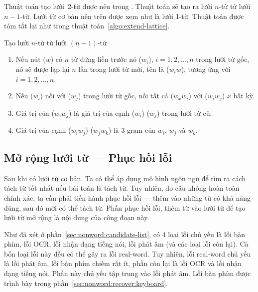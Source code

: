 \documentclass[a4paper,oneside,14pt]{extbook} %
\begin{document}
Thuật toán tạo lưới~2-từ được nêu trong \cite{Ravishankar}. Thuật toán
sẽ tạo ra lưới $n$-từ từ lưới $n-1$-từ. Lưới từ cơ bản nên trên được
xem như là lưới 1-từ. Thuật toán được tóm tắt lại như trong thuật
toán~\ref{algo:extend-lattice}.

\begin{algo}
\caption{Tạo lưới $n$-từ từ lưới $(n-1)$-từ}
\label{algo:extend-lattice}
\begin{enumerate}
\item Nếu nút ($w$) có $n$ từ đứng liền trước nó ($w_i$),
  $i=1,2,\ldots{},n$ trong lưới từ gốc, nó sẽ được lặp lại $n$ lần trong
  lưới từ mới, tên là ($w_{i}w$), tương ứng với $i=1,2,\ldots{},n$.
\item Nếu ($w_i$) nối với ($w_j$) trong lưới từ gốc, nối tất cả
  ($w_xw_i$) với ($w_iw_j$) $x$ bất kỳ.
\item Giá trị của ($w_iw_j$) là giá trị của cạnh ($w_i$) ($w_j$) trong
  lưới từ cũ.
\item Giá trị của cạnh ($w_iw_j$) ($w_jw_k$) là 3-gram của $w_i$, $w_j$
  và $w_k$.
\end{enumerate}
\end{algo}





\subsection{Mở rộng lưới từ  --- Phục hồi lỗi}
\label{sec:realword:recover}

Sau khi có lưới từ cơ bản. Ta có thể áp dụng mô hình ngôn ngữ để tìm
ra cách tách từ tốt nhất nếu bài toán là tách từ. Tuy nhiên, do câu
không hoàn toàn chính xác, ta cần phải tiến hành phục hồi lỗi --- thêm
vào những từ có khả năng đúng, sau đó mới có thể tách từ. Phần phục
hồi lỗi, thêm từ vào lưới từ để tạo lưới từ mở rộng là nội dung của
công đoạn này.

Như đã xét ở phần~\ref{sec:nonword:candidate-list}, có 4 loại lỗi chủ
yếu là lỗi bàn phím, lỗi OCR, lỗi nhận dạng tiếng nói, lỗi phát âm (và
các loại lỗi còn lại). Cả bốn loại lỗi này đều có thể gây ra lỗi
real-word. Tuy nhiên, lỗi real-word chủ yếu là lỗi phát âm, lỗi bàn
phím chiếm rất ít, phần còn lại là lỗi OCR và lỗi nhận dạng tiếng
nói. Phần này chủ yếu tập trung vào lỗi phát âm. Lỗi bàn phím được
trình bày trong phần~\ref{sec:nonword:recover:keyboard}.
\end{document}
